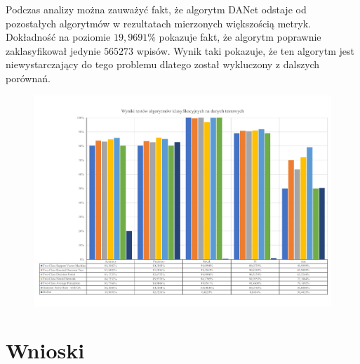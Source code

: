 Podczas analizy można zauważyć fakt, że algorytm DANet odstaje od pozostałych algorytmów w rezultatach mierzonych większością metryk. Dokładność na poziomie $19,9691\%$ pokazuje fakt, że algorytm poprawnie zaklasyfikował jedynie $565273$ wpisów. Wynik taki pokazuje, że ten algorytm jest niewystarczający do tego problemu dlatego został wykluczony z dalszych porównań.

\begin{landscape}
    \vspace*{\fill}
    \begin{figure}[H]
        \centering
        \includegraphics[height=0.8\textwidth]{images/predict_result}
        \label{fig:predict-result}
    \end{figure}
    \vfill
\end{landscape}


\section{Wnioski}

